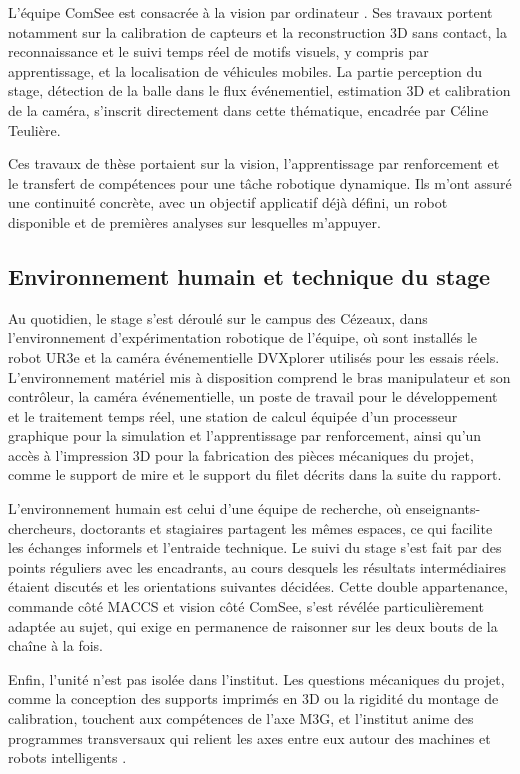 \documentclass[a4paper,11pt]{report}
\begin{document}
L'équipe ComSee est consacrée à la vision par ordinateur \cite{ip-comsee}. Ses travaux portent notamment sur la calibration de capteurs et la reconstruction 3D sans contact, la reconnaissance et le suivi temps réel de motifs visuels, y compris par apprentissage, et la localisation de véhicules mobiles. La partie perception du stage, détection de la balle dans le flux événementiel, estimation 3D et calibration de la caméra, s'inscrit directement dans cette thématique, encadrée par Céline Teulière.

Ces travaux de thèse \cite{antonio-stage} portaient sur la vision, l'apprentissage par renforcement et le transfert de compétences pour une tâche robotique dynamique. Ils m'ont assuré une continuité concrète, avec un objectif applicatif déjà défini, un robot disponible et de premières analyses sur lesquelles m'appuyer.

\subsection{Environnement humain et technique du stage}

Au quotidien, le stage s'est déroulé sur le campus des Cézeaux, dans l'environnement d'expérimentation robotique de l'équipe, où sont installés le robot UR3e et la caméra événementielle DVXplorer utilisés pour les essais réels. L'environnement matériel mis à disposition comprend le bras manipulateur et son contrôleur, la caméra événementielle, un poste de travail pour le développement et le traitement temps réel, une station de calcul équipée d'un processeur graphique pour la simulation et l'apprentissage par renforcement, ainsi qu'un accès à l'impression 3D pour la fabrication des pièces mécaniques du projet, comme le support de mire et le support du filet décrits dans la suite du rapport.

L'environnement humain est celui d'une équipe de recherche, où enseignants-chercheurs, doctorants et stagiaires partagent les mêmes espaces, ce qui facilite les échanges informels et l'entraide technique. Le suivi du stage s'est fait par des points réguliers avec les encadrants, au cours desquels les résultats intermédiaires étaient discutés et les orientations suivantes décidées. Cette double appartenance, commande côté MACCS et vision côté ComSee, s'est révélée particulièrement adaptée au sujet, qui exige en permanence de raisonner sur les deux bouts de la chaîne à la fois.

Enfin, l'unité n'est pas isolée dans l'institut. Les questions mécaniques du projet, comme la conception des supports imprimés en 3D ou la rigidité du montage de calibration, touchent aux compétences de l'axe M3G, et l'institut anime des programmes transversaux qui relient les axes entre eux autour des machines et robots intelligents \cite{institut-pascal}.
\end{document}
